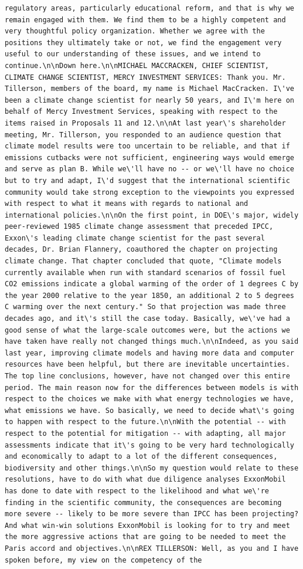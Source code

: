 \documentclass[
  letterpaper,
  DIV=11,
  numbers=noendperiod]{scrreprt}
\begin{document}
\begin{verbatim}
regulatory areas, particularly educational reform, and that is why we remain engaged with them. We find them to be a highly competent and very thoughtful policy organization. Whether we agree with the positions they ultimately take or not, we find the engagement very useful to our understanding of these issues, and we intend to continue.\n\nDown here.\n\nMICHAEL MACCRACKEN, CHIEF SCIENTIST, CLIMATE CHANGE SCIENTIST, MERCY INVESTMENT SERVICES: Thank you. Mr. Tillerson, members of the board, my name is Michael MacCracken. I\'ve been a climate change scientist for nearly 50 years, and I\'m here on behalf of Mercy Investment Services, speaking with respect to the items raised in Proposals 11 and 12.\n\nAt last year\'s shareholder meeting, Mr. Tillerson, you responded to an audience question that climate model results were too uncertain to be reliable, and that if emissions cutbacks were not sufficient, engineering ways would emerge and serve as plan B. While we\'ll have no -- or we\'ll have no choice but to try and adapt, I\'d suggest that the international scientific community would take strong exception to the viewpoints you expressed with respect to what it means with regards to national and international policies.\n\nOn the first point, in DOE\'s major, widely peer-reviewed 1985 climate change assessment that preceded IPCC, Exxon\'s leading climate change scientist for the past several decades, Dr. Brian Flannery, coauthored the chapter on projecting climate change. That chapter concluded that quote, "Climate models currently available when run with standard scenarios of fossil fuel CO2 emissions indicate a global warming of the order of 1 degrees C by the year 2000 relative to the year 1850, an additional 2 to 5 degrees C warming over the next century." So that projection was made three decades ago, and it\'s still the case today. Basically, we\'ve had a good sense of what the large-scale outcomes were, but the actions we have taken have really not changed things much.\n\nIndeed, as you said last year, improving climate models and having more data and computer resources have been helpful, but there are inevitable uncertainties. The top line conclusions, however, have not changed over this entire period. The main reason now for the differences between models is with respect to the choices we make with what energy technologies we have, what emissions we have. So basically, we need to decide what\'s going to happen with respect to the future.\n\nWith the potential -- with respect to the potential for mitigation -- with adapting, all major assessments indicate that it\'s going to be very hard technologically and economically to adapt to a lot of the different consequences, biodiversity and other things.\n\nSo my question would relate to these resolutions, have to do with what due diligence analyses ExxonMobil has done to date with respect to the likelihood and what we\'re finding in the scientific community, the consequences are becoming more severe -- likely to be more severe than IPCC has been projecting? And what win-win solutions ExxonMobil is looking for to try and meet the more aggressive actions that are going to be needed to meet the Paris accord and objectives.\n\nREX TILLERSON: Well, as you and I have spoken before, my view on the competency of the 
\end{verbatim}
\end{document}
